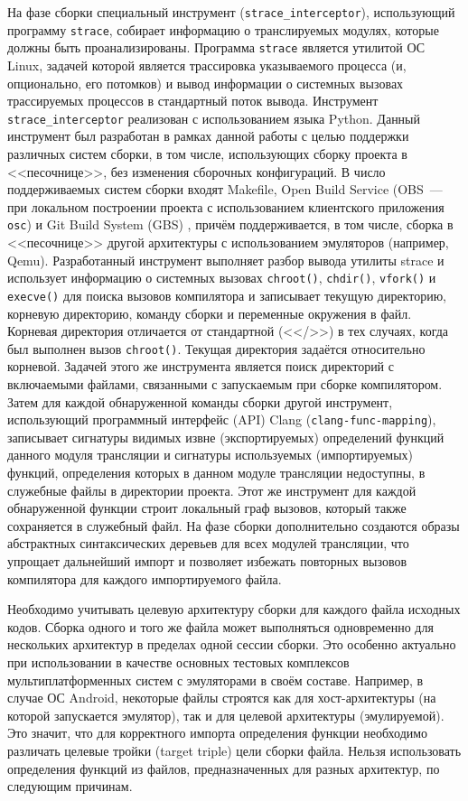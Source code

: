 На фазе сборки специальный инструмент (\texttt{strace\_interceptor}), использующий программу \texttt{strace}, собирает информацию о транслируемых модулях, которые должны быть проанализированы. Программа \texttt{strace} является утилитой ОС Linux, задачей которой является трассировка указываемого процесса (и, опционально, его потомков) и вывод информации о системных вызовах трассируемых процессов в стандартный поток вывода. Инструмент \texttt{strace\_interceptor} реализован с использованием языка Python. Данный инструмент был разработан в рамках данной работы с целью поддержки различных систем сборки, в том числе, использующих сборку проекта в <<песочнице>>, без изменения сборочных конфигураций. В число поддерживаемых систем сборки входят Makefile, Open Build Service (OBS~--- при локальном построении проекта с использованием клиентского приложения \texttt{osc}) \cite{obs} и Git Build System (GBS) \cite{gbs}, причём поддерживается, в том числе, сборка в <<песочнице>> другой архитектуры с использованием эмуляторов (например, Qemu). Разработанный инструмент выполняет разбор вывода утилиты strace и использует информацию о системных вызовах \texttt{chroot()}, \texttt{chdir()}, \texttt{vfork()} и \texttt{execve()} для поиска вызовов компилятора и записывает текущую директорию, корневую директорию, команду сборки и переменные окружения в файл. Корневая директория отличается от стандартной (<</>>) в тех случаях, когда был выполнен вызов \texttt{chroot()}. Текущая директория задаётся относительно корневой. Задачей этого же инструмента является поиск директорий с включаемыми файлами, связанными с запускаемым при сборке компилятором. Затем для каждой обнаруженной команды сборки другой инструмент, использующий программный интерфейс (API) Clang (\texttt{clang-func-mapping}), записывает сигнатуры видимых извне (экспортируемых) определений функций данного модуля трансляции и сигнатуры используемых (импортируемых) функций, определения которых в данном модуле трансляции недоступны, в служебные файлы в директории проекта. Этот же инструмент для каждой обнаруженной функции строит локальный граф вызовов, который также сохраняется в служебный файл. На фазе сборки дополнительно создаются образы абстрактных синтаксических деревьев для всех модулей трансляции, что упрощает дальнейший импорт и позволяет избежать повторных вызовов компилятора для каждого импортируемого файла.

Необходимо учитывать целевую архитектуру сборки для каждого файла исходных кодов. Сборка одного и того же файла может выполняться одновременно для нескольких архитектур в пределах одной сессии сборки. Это особенно актуально при использовании в качестве основных тестовых комплексов мультиплатформенных систем с эмуляторами в своём составе. Например, в случае ОС Android, некоторые файлы строятся как для хост-архитектуры (на которой запускается эмулятор), так и для целевой архитектуры (эмулируемой). Это значит, что для корректного импорта определения функции необходимо различать целевые тройки (target triple) цели сборки файла. Нельзя использовать определения функций из файлов, предназначенных для разных архитектур, по следующим причинам.

